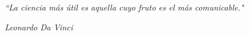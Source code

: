 \documentclass{beamer}
\begin{document}

\begin{frame}
\begin{center}
\Huge 
\textit{``La ciencia más útil es aquella cuyo fruto es el más comunicable."}
\end{center}
\begin{flushright}
\small
\textit{Leonardo Da Vinci}
\end{flushright}
\end{frame}
\end{document}
